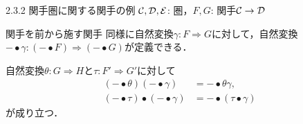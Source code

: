 \documentclass[uplatex,a4paper,dvipdfmx,aspectratio=169,10pt]{beamer}
\begin{document}
\begin{frame}[fragile]{2.3.2 関手圏に関する関手の例}
    $\mathcal{C}, \mathcal{D}, \mathcal{E}$: 圏，$F, G$: 関手$\mathcal{C} \to \mathcal{D}$
    \begin{exampleblock}{ 関手を前から施す関手}
        同様に自然変換$\gamma \colon F \Rightarrow G$に対して，自然変換$- \bullet \gamma \colon (- \bullet F) \Rightarrow (- \bullet G)$が定義できる．
    \end{exampleblock}
    自然変換$\theta \colon G \Rightarrow H$と$\tau \colon F' \Rightarrow G'$に対して
    \begin{equation*}
        \begin{aligned}
            (- \bullet \theta) (- \bullet \gamma) &= - \bullet \theta\gamma, \\
            (- \bullet \tau) \bullet (- \bullet \gamma) &= - \bullet (\tau \bullet \gamma)
        \end{aligned}
        \tag{2.27}
    \end{equation*}
    が成り立つ．
\end{frame}
\end{document}
